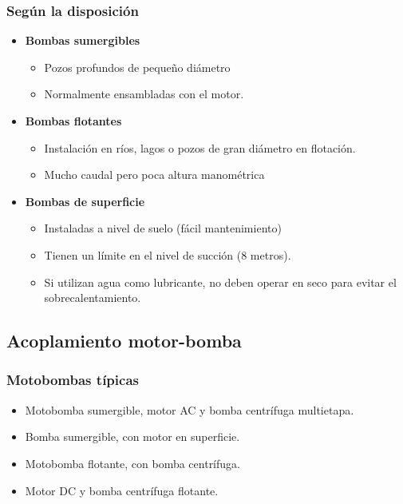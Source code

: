 \documentclass[serif, xcolor=dvipsnames]{beamer}
\begin{document}
\begin{frame}
\frametitle{Según la disposición}
\begin{itemize}
\item \textbf{Bombas sumergibles}

\begin{itemize}
\item Pozos profundos de pequeño diámetro
\item Normalmente ensambladas con el motor.
\end{itemize}
\item \textbf{Bombas flotantes}

\begin{itemize}
\item Instalación en ríos, lagos o pozos de gran diámetro en flotación.
\item Mucho caudal pero poca altura manométrica
\end{itemize}
\item \textbf{Bombas de superficie}

\begin{itemize}
\item Instaladas a nivel de suelo (fácil mantenimiento)
\item Tienen un límite en el nivel de succión (8 metros).
\item Si utilizan agua como lubricante, no deben operar en seco para evitar
el sobrecalentamiento.
\end{itemize}
\end{itemize}

\end{frame}

\subsection{Acoplamiento motor-bomba}


\begin{frame}
\frametitle{Motobombas típicas}
\begin{block}
{}
\begin{itemize}
\item Motobomba sumergible, motor AC y bomba centrífuga multietapa.
\item Bomba sumergible, con motor en superficie.
\item Motobomba flotante, con bomba centrífuga.
\item Motor DC y bomba centrífuga flotante.
\end{itemize}
\end{block}

\end{frame}
\end{document}
